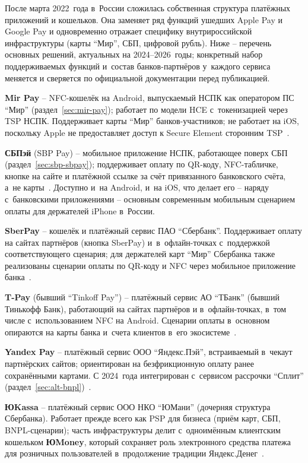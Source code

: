 После марта 2022~года в~России сложилась собственная
структура платёжных приложений и кошельков. Она заменяет ряд
функций ушедших Apple Pay и Google Pay и одновременно отражает
специфику внутрироссийской инфраструктуры (карты \enquote{Мир},
СБП, цифровой рубль). Ниже -- перечень основных решений, актуальных
на 2024--2026~годы; конкретный набор поддерживаемых функций
и~состав банков-партнёров у~каждого сервиса меняется и сверяется
по официальной документации перед публикацией.

\textbf{Mir Pay} -- NFC-кошелёк на Android, выпускаемый
НСПК как оператором ПС \enquote{Мир} (раздел~\ref{sec:mir-pay});
работает по модели HCE с~токенизацией через TSP НСПК.
Поддерживает карты \enquote{Мир} банков-участников;
не работает на iOS, поскольку Apple не предоставляет
доступ к Secure Element сторонним TSP~\cite{mir-pay-help,nspk-tsp}.

\textbf{СБПэй} (SBP Pay) -- мобильное приложение НСПК,
работающее поверх СБП (раздел~\ref{sec:sbp-sbpay}); поддерживает
оплату по QR-коду, NFC-табличке, кнопке на сайте и платёжной
ссылке за счёт привязанного банковского счёта, а~не
карты~\cite{sbpay-app}. Доступно и~на Android, и~на iOS,
что делает его -- наряду с~банковскими приложениями --
основным современным мобильным сценарием оплаты для
держателей iPhone в~России.

\textbf{SberPay} -- кошелёк и платёжный сервис ПАО \enquote{Сбербанк}.
Поддерживает оплату на сайтах партнёров (кнопка SberPay)
и~в~офлайн-точках с~поддержкой соответствующего сценария;
для держателей карт \enquote{Мир} Сбербанка также реализованы
сценарии оплаты по QR-коду и NFC через мобильное приложение
банка~\cite{sber-pay}.

\textbf{T-Pay} (бывший \enquote{Tinkoff Pay}) -- платёжный
сервис АО \enquote{ТБанк} (бывший Тинькофф Банк), работающий
на сайтах партнёров и в~офлайн-точках, в~том числе с~использованием
NFC на Android. Сценарии оплаты в~основном опираются на карты
банка и~счета клиентов в~его экосистеме~\cite{tpay}.

\textbf{Yandex Pay} -- платёжный сервис ООО \enquote{Яндекс.Пэй},
встраиваемый в~чекаут партнёрских сайтов; ориентирован на
безфрикционную оплату ранее сохранёнными картами. С 2024~года
интегрирован с~сервисом рассрочки \enquote{Сплит}
(раздел~\ref{sec:alt-bnpl})~\cite{yandex-pay,yandex-split}.

\textbf{ЮKassa} -- платёжный сервис ООО НКО \enquote{ЮМани}
(дочерняя структура Сбербанка). Работает прежде всего как PSP
для бизнеса (приём карт, СБП, BNPL-сценарии); часть инфраструктуры
делит с~одноимённым клиентским кошельком \textbf{ЮMoney},
который сохраняет роль электронного средства платежа для
розничных пользователей в~продолжение традиции Яндекс.Денег~\cite{yookassa,yoomoney}.

